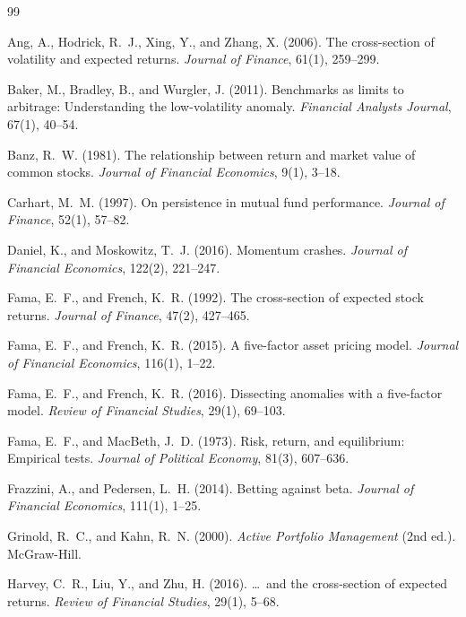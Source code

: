 \documentclass[11pt,a4paper]{article}
\begin{document}
\begin{thebibliography}{99}
\setlength{\itemsep}{2pt}
\small

Ang, A., Hodrick, R.~J., Xing, Y., and Zhang, X. (2006). The cross-section of volatility and expected returns. \textit{Journal of Finance}, 61(1), 259--299.

Baker, M., Bradley, B., and Wurgler, J. (2011). Benchmarks as limits to arbitrage: Understanding the low-volatility anomaly. \textit{Financial Analysts Journal}, 67(1), 40--54.

Banz, R.~W. (1981). The relationship between return and market value of common stocks. \textit{Journal of Financial Economics}, 9(1), 3--18.

Carhart, M.~M. (1997). On persistence in mutual fund performance. \textit{Journal of Finance}, 52(1), 57--82.

Daniel, K., and Moskowitz, T.~J. (2016). Momentum crashes. \textit{Journal of Financial Economics}, 122(2), 221--247.

Fama, E.~F., and French, K.~R. (1992). The cross-section of expected stock returns. \textit{Journal of Finance}, 47(2), 427--465.

Fama, E.~F., and French, K.~R. (2015). A five-factor asset pricing model. \textit{Journal of Financial Economics}, 116(1), 1--22.

Fama, E.~F., and French, K.~R. (2016). Dissecting anomalies with a five-factor model. \textit{Review of Financial Studies}, 29(1), 69--103.

Fama, E.~F., and MacBeth, J.~D. (1973). Risk, return, and equilibrium: Empirical tests. \textit{Journal of Political Economy}, 81(3), 607--636.

Frazzini, A., and Pedersen, L.~H. (2014). Betting against beta. \textit{Journal of Financial Economics}, 111(1), 1--25.

Grinold, R.~C., and Kahn, R.~N. (2000). \textit{Active Portfolio Management} (2nd ed.). McGraw-Hill.

Harvey, C.~R., Liu, Y., and Zhu, H. (2016). \ldots\ and the cross-section of expected returns. \textit{Review of Financial Studies}, 29(1), 5--68.


\end{thebibliography}
\end{document}
